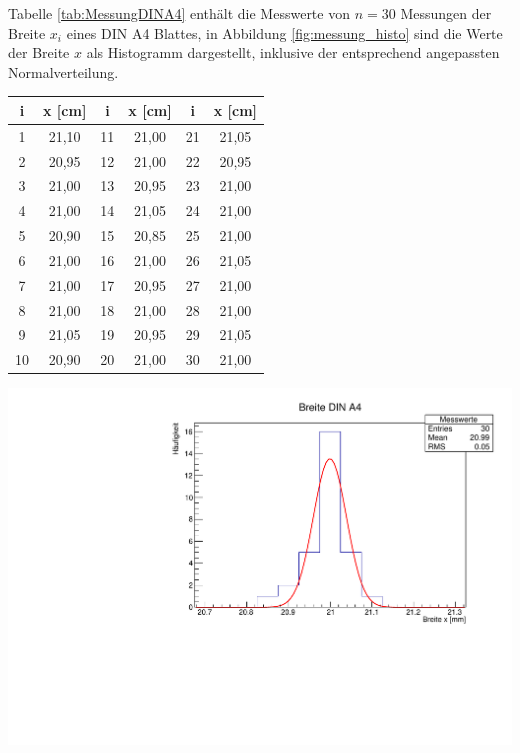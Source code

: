Tabelle \ref{tab:MessungDINA4} enthält die Messwerte von $n=30$ Messungen der Breite $x_i$ eines DIN A4 Blattes, in Abbildung \ref{fig:messung_histo} sind die Werte der Breite $x$ als Histogramm dargestellt, inklusive der entsprechend angepassten Normalverteilung.

\begin{minipage}{.45\textwidth}
	\centering
		\begin{tabular}[t]{|c|c||c|c||c|c|} 
			i & x [cm] & i & x [cm] & i & x [cm]\\
			\hline
			1 & 21,10 & 11 & 21,00 & 21 & 21,05\\
			2 & 20,95 & 12 & 21,00 & 22 & 20,95\\
			3 & 21,00 & 13 & 20,95 & 23 & 21,00\\
			4 & 21,00 & 14 & 21,05 & 24 & 21,00\\
			5 & 20,90 & 15 & 20,85 & 25 & 21,00\\
			6 & 21,00 & 16 & 21,00 & 26 & 21,05\\
			7 & 21,00 & 17 & 20,95 & 27 & 21,00\\
			8 & 21,00 & 18 & 21,00 & 28 & 21,00\\
			9 & 21,05 & 19 & 20,95 & 29 & 21,05\\
			10& 20,90 & 20 & 21,00 & 30 & 21,00\\
		\end{tabular}
	\label{tab:MessungDINA4}
%
\end{minipage}\hfill
%
\begin{minipage}{.45\textwidth}
	\includegraphics[width=1.00\textwidth]{00_einl/messung_histo.pdf}
	\label{fig:messung_histo}
\end{minipage}

